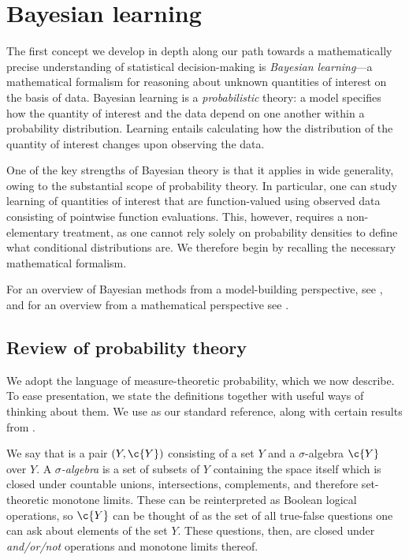 \documentclass[11pt]{book}
\begin{document}
\section{Bayesian learning}

The first concept we develop in depth along our path towards a mathematically precise understanding of statistical decision-making is \emph{Bayesian learning}---a mathematical formalism for reasoning about unknown quantities of interest on the basis of data.
Bayesian learning is a \emph{probabilistic} theory: a model specifies how the quantity of interest and the data depend on one another within a probability distribution.
Learning entails calculating how the distribution of the quantity of interest changes upon observing the data.

One of the key strengths of Bayesian theory is that it applies in wide generality, owing to the substantial scope of probability theory. 
In particular, one can study learning of quantities of interest that are function-valued using observed data consisting of pointwise function evaluations.
This, however, requires a non-elementary treatment, as one cannot rely solely on probability densities to define what conditional distributions are.
We therefore begin by recalling the necessary mathematical formalism.

For an overview of Bayesian methods from a model-building perspective, see \textcite{gelman14}, and for an overview from a mathematical perspective see \textcite{ghosal17,gine15}.

\subsection{Review of probability theory}
We adopt the language of measure-theoretic probability, which we now describe.
To ease presentation, we state the definitions together with useful ways of thinking about them.
We use \textcite{kallenberg06} as our standard reference, along with certain results from \textcite{bogachev07a,bogachev07b}.

We say that  is a pair $(Y,\c{Y})$ consisting of a set $Y$ and a $\sigma$-algebra $\c{Y}$ over $Y$.
A \emph{$\sigma$-algebra} is a set of subsets of $Y$ containing the space itself which is closed under countable unions, intersections, complements, and therefore set-theoretic monotone limits.
These can be reinterpreted as Boolean logical operations, so $\c{Y}$ can be thought of as the set of all true-false questions one can ask about elements of the set $Y$. 
These questions, then, are closed under \emph{and/or/not} operations and monotone limits thereof.
\end{document}
